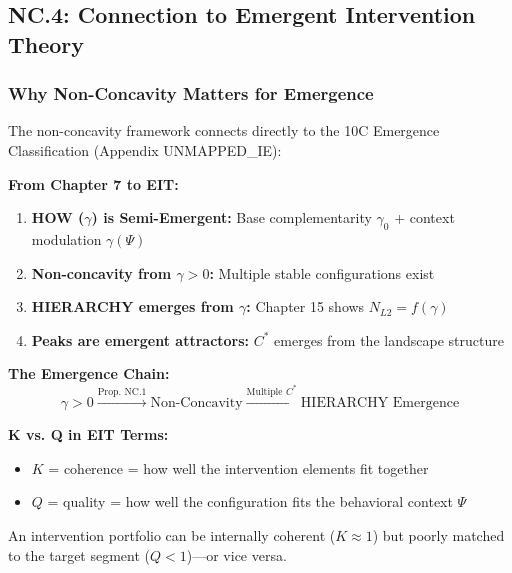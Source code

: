 
\subsection{NC.4: Connection to Emergent Intervention Theory}
\label{sec:nc-eit}

\subsubsection{Why Non-Concavity Matters for Emergence}

The non-concavity framework connects directly to the 10C Emergence Classification (Appendix UNMAPPED_IE):

\begin{tcolorbox}[colback=green!5!white, colframe=green!75!black,
    title=\textbf{Connection to EIT: How $\gamma$ Creates Emergence}]

\textbf{From Chapter 7 to EIT:}
\begin{enumerate}
\item \textbf{HOW ($\gamma$) is Semi-Emergent:} Base complementarity $\gamma_0$ + context modulation $\gamma(\Psi)$
\item \textbf{Non-concavity from $\gamma > 0$:} Multiple stable configurations exist
\item \textbf{HIERARCHY emerges from $\gamma$:} Chapter 15 shows $N_{L2} = f(\gamma)$
\item \textbf{Peaks are emergent attractors:} $C^*$ emerges from the landscape structure
\end{enumerate}

\textbf{The Emergence Chain:}
\begin{equation}
\gamma > 0 \xrightarrow{\text{Prop. NC.1}} \text{Non-Concavity} \xrightarrow{\text{Multiple } C^*} \text{HIERARCHY Emergence}
\end{equation}

\textbf{K vs. Q in EIT Terms:}
\begin{itemize}
\item $K$ = coherence = how well the intervention elements fit together
\item $Q$ = quality = how well the configuration fits the behavioral context $\Psi$
\end{itemize}

An intervention portfolio can be internally coherent ($K \approx 1$) but poorly matched to the target segment ($Q < 1$)---or vice versa.
\end{tcolorbox}

